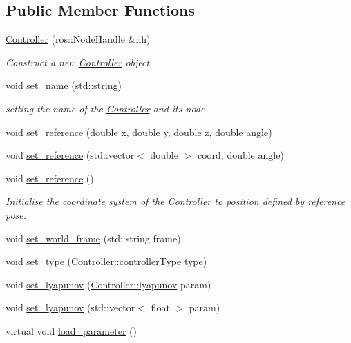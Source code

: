 \subsection*{Public Member Functions}
\begin{DoxyCompactItemize}
\item 
\hyperlink{classController_a7341f9092e1977cdd2a1492c4422c019}{Controller} (ros\+::\+Node\+Handle \&nh)
\begin{DoxyCompactList}\small\item\em Construct a new \hyperlink{classController}{Controller} object. \end{DoxyCompactList}\item 
void \hyperlink{classController_ad2629427a3a56571a1807f1e03c72b5f}{set\+\_\+name} (std\+::string)\hypertarget{classController_ad2629427a3a56571a1807f1e03c72b5f}{}\label{classController_ad2629427a3a56571a1807f1e03c72b5f}

\begin{DoxyCompactList}\small\item\em setting the name of the \hyperlink{classController}{Controller} and its node \end{DoxyCompactList}\item 
void \hyperlink{classController_ade57ae23226a7565521694c87ec79c90}{set\+\_\+reference} (double x, double y, double z, double angle)
\item 
void \hyperlink{classController_aefad16ae5d5df8baac0ed044018eb6c6}{set\+\_\+reference} (std\+::vector$<$ double $>$ coord, double angle)
\item 
void \hyperlink{classController_a3a417d33a8ecc6e83f3c43e3a4da74cd}{set\+\_\+reference} ()\hypertarget{classController_a3a417d33a8ecc6e83f3c43e3a4da74cd}{}\label{classController_a3a417d33a8ecc6e83f3c43e3a4da74cd}

\begin{DoxyCompactList}\small\item\em Initialise the coordinate system of the \hyperlink{classController}{Controller} to position defined by reference pose. \end{DoxyCompactList}\item 
void \hyperlink{classController_aeeb360dd2e4afb5c654f5bca4c0f00ca}{set\+\_\+world\+\_\+frame} (std\+::string frame)
\item 
void \hyperlink{classController_a7134d173f5f91755d8a3c7e07ca04da9}{set\+\_\+type} (Controller\+::controller\+Type type)
\item 
void \hyperlink{classController_a2ebb5b813be3525b44af61eb6f165964}{set\+\_\+lyapunov} (\hyperlink{structController_1_1lyapunov}{Controller\+::lyapunov} param)
\item 
void \hyperlink{classController_afb2d5fec93db7b68a16767823f4c1675}{set\+\_\+lyapunov} (std\+::vector$<$ float $>$ param)
\item 
virtual void \hyperlink{classController_a0758387181bc5902176813cc686cb088}{load\+\_\+parameter} ()\hypertarget{classController_a0758387181bc5902176813cc686cb088}{}\label{classController_a0758387181bc5902176813cc686cb088}


\end{DoxyCompactItemize}

